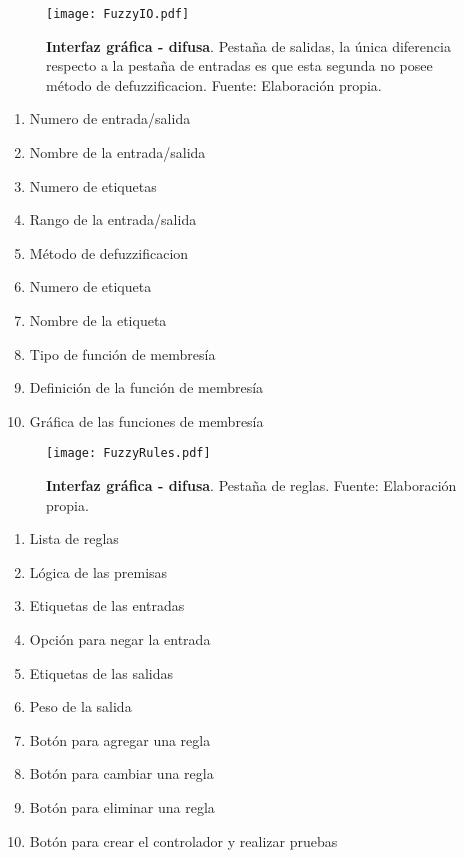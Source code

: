     \vfill

    \pagebreak
    
    \begin{figure}[htb]
        \centering
        \texttt{[image: FuzzyIO.pdf]}
        \caption[Interfaz gráfica - difusa - entradas/salidas]{\textbf{Interfaz gráfica - difusa}. Pestaña de salidas, la única diferencia respecto a la pestaña de entradas es que esta segunda no posee método de defuzzificacion. Fuente: Elaboración propia.} 
        \label{fig:FuzzyIO}
    \end{figure}

    \begin{multicols}{2}
        \begin{enumerate}[leftmargin=20pt]
            \item Numero de entrada/salida
            \item Nombre de la entrada/salida
            \item Numero de etiquetas
            \item Rango de la entrada/salida
            \item Método de defuzzificacion
            \item Numero de etiqueta
            \item Nombre de la etiqueta
            \item Tipo de función de membresía
            \item Definición de la función de membresía
            \item Gráfica de las funciones de membresía
        \end{enumerate}
    \end{multicols}

    \begin{figure}[!h]
        \centering
        \texttt{[image: FuzzyRules.pdf]}
        \caption[Interfaz gráfica - difusa - reglas]{\textbf{Interfaz gráfica - difusa}. Pestaña de reglas. Fuente: Elaboración propia.} 
        \label{fig:FuzzyRules}
    \end{figure}

    \begin{multicols}{2}
        \begin{enumerate}[leftmargin=20pt]
            \item Lista de reglas
            \item Lógica de las premisas
            \item Etiquetas de las entradas
            \item Opción para negar la entrada
            \item Etiquetas de las salidas
            \item Peso de la salida
            \item Botón para agregar una regla
            \item Botón para cambiar una regla
            \item Botón para eliminar una regla
            \item Botón para crear el controlador y realizar pruebas
        \end{enumerate}
    \end{multicols}

